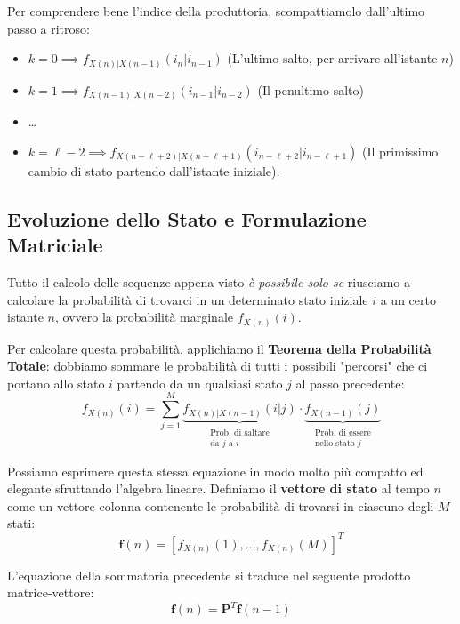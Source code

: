 Per comprendere bene l'indice della produttoria, scompattiamolo dall'ultimo passo a ritroso:
\begin{itemize}
    \item $k=0 \implies f_{X(n)|X(n-1)}(i_n | i_{n-1})$ (L'ultimo salto, per arrivare all'istante $n$)
    \item $k=1 \implies f_{X(n-1)|X(n-2)}(i_{n-1} | i_{n-2})$ (Il penultimo salto)
    \item \dots
    \item $k=\ell-2 \implies f_{X(n-\ell+2)|X(n-\ell+1)}(i_{n-\ell+2} | i_{n-\ell+1})$ (Il primissimo cambio di stato partendo dall'istante iniziale).
\end{itemize}

\subsection{Evoluzione dello Stato e Formulazione Matriciale}

Tutto il calcolo delle sequenze appena visto \textit{è possibile solo se} riusciamo a calcolare la probabilità di trovarci in un determinato stato iniziale $i$ a un certo istante $n$, ovvero la probabilità marginale $f_{X(n)}(i)$.

Per calcolare questa probabilità, applichiamo il \textbf{Teorema della Probabilità Totale}: dobbiamo sommare le probabilità di tutti i possibili "percorsi" che ci portano allo stato $i$ partendo da un qualsiasi stato $j$ al passo precedente:
\begin{equation}
    f_{X(n)}(i) = \sum_{j=1}^{M} \underbrace{f_{X(n)|X(n-1)}(i|j)}_{\substack{\text{Prob. di saltare}\\ \text{da } j \text{ a } i}} \cdot \underbrace{f_{X(n-1)}(j)}_{\substack{\text{Prob. di essere}\\ \text{nello stato } j}}
\end{equation}

Possiamo esprimere questa stessa equazione in modo molto più compatto ed elegante sfruttando l'algebra lineare. 
Definiamo il \textbf{vettore di stato} al tempo $n$ come un vettore colonna contenente le probabilità di trovarsi in ciascuno degli $M$ stati:
\begin{equation}
    \mathbf{f}(n) = \left[ f_{X(n)}(1), \dots, f_{X(n)}(M) \right]^T
\end{equation}

L'equazione della sommatoria precedente si traduce nel seguente prodotto matrice-vettore:
\begin{equation}
\label{eq:markov_evolution}
    \boxed{ \mathbf{f}(n) = \mathbf{P}^T \mathbf{f}(n-1) }
\end{equation}

